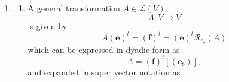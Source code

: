 \documentclass[aps,preprint]{revtex4}
\begin{document}
\begin{enumerate}
\item 
\begin{enumerate}
\item A general transformation $A\in \mathcal{L}\left( V\right) $ 
\begin{equation}
A:V\rightarrow V
\end{equation}%
is given by 
\begin{equation}
A\left( \boldsymbol{e}\right) ^{t}=\left( \boldsymbol{f}\right) ^{t}=\left( 
\boldsymbol{e}\right) ^{t}\mathcal{R}_{e_{b}}\left( A\right)
\end{equation}%
which can be expressed in dyadic form as 
\begin{equation}
A=\left( \boldsymbol{f}\right) ^{t}\left[ \left( \boldsymbol{e}_{b}\right) %
\right] ,
\end{equation}%
and expanded in super vector notation as


\end{enumerate}
\end{enumerate}
\end{document}
